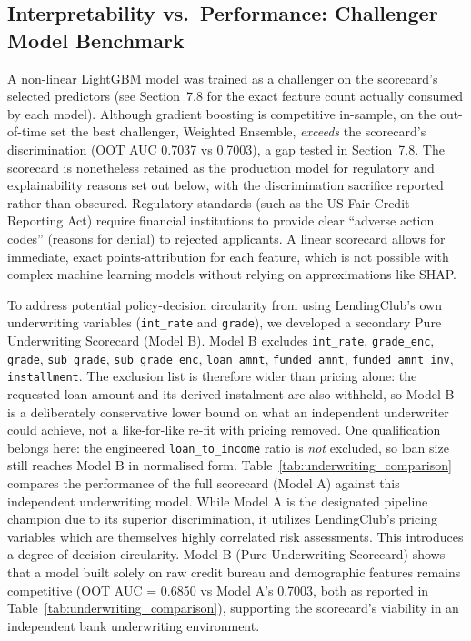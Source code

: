 \documentclass[11pt,a4paper]{article}
\begin{document}
\subsection{Interpretability vs.\ Performance: Challenger Model Benchmark}
A non-linear LightGBM model was trained as a challenger \parencite{baesens2016} on the scorecard's selected predictors (see Section~7.8 for the exact feature count actually consumed by each model). Although gradient boosting is competitive in-sample, on the out-of-time set the best challenger, Weighted Ensemble, \emph{exceeds} the scorecard's discrimination (OOT AUC 0.7037 vs 0.7003), a gap tested in Section~7.8. The scorecard is nonetheless retained as the production model for regulatory and explainability reasons set out below, with the discrimination sacrifice reported rather than obscured. Regulatory standards (such as the US Fair Credit Reporting Act) require financial institutions to provide clear ``adverse action codes'' (reasons for denial) to rejected applicants. A linear scorecard allows for immediate, exact points-attribution for each feature, which is not possible with complex machine learning models without relying on approximations like SHAP.

To address potential policy-decision circularity from using LendingClub's own underwriting variables (\texttt{int\_rate} and \texttt{grade}), we developed a secondary Pure Underwriting Scorecard (Model B). Model B excludes \texttt{int\_rate}, \texttt{grade\_enc}, \texttt{grade}, \texttt{sub\_grade}, \texttt{sub\_grade\_enc}, \texttt{loan\_amnt}, \texttt{funded\_amnt}, \texttt{funded\_amnt\_inv}, \texttt{installment}. The exclusion list is therefore wider than pricing alone: the requested loan amount and its derived instalment are also withheld, so Model B is a deliberately conservative lower bound on what an independent underwriter could achieve, not a like-for-like re-fit with pricing removed. One qualification belongs here: the engineered \texttt{loan\_to\_income} ratio is \emph{not} excluded, so loan size still reaches Model B in normalised form. Table~\ref{tab:underwriting_comparison} compares the performance of the full scorecard (Model A) against this independent underwriting model. While Model A is the designated pipeline champion due to its superior discrimination, it utilizes LendingClub's pricing variables which are themselves highly correlated risk assessments. This introduces a degree of decision circularity. Model B (Pure Underwriting Scorecard) shows that a model built solely on raw credit bureau and demographic features remains competitive (OOT AUC = 0.6850 vs Model A's 0.7003, both as reported in Table~\ref{tab:underwriting_comparison}), supporting the scorecard's viability in an independent bank underwriting environment.
\end{document}
